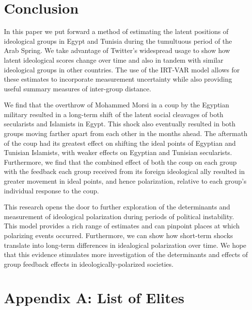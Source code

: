 \documentclass[12pt]{article}
\begin{document}
\section*{Conclusion}

In this paper we put forward a method of estimating the latent positions of ideological groups in Egypt and Tunisia during the tumultuous period of the Arab Spring. We take advantage of Twitter's widespread usage to show how latent ideological scores change over time and also in tandem with similar ideological groups in other countries. The use of the IRT-VAR model allows for these estimates to incorporate measurement uncertainty while also providing useful summary measures of inter-group distance.

We find that the overthrow of Mohammed Morsi in a coup by the Egyptian military resulted in a long-term shift of the latent social cleavages of both secularists and Islamists in Egypt. This shock also eventually resulted in both groups moving farther apart from each other in the months ahead. The aftermath of the coup had its greatest effect on shifting the ideal points of Egyptian and Tunisian Islamists, with weaker effects on Egyptian and Tunisian secularists. Furthermore, we find that the combined effect of both the coup on each group with the feedback each group received from its foreign ideological ally resulted in greater movement in ideal points, and hence polarization, relative to each group's individual response to the coup. 

This research opens the door to further exploration of the determinants and measurement of ideological polarization during periods of political instability. This model provides a rich range of estimates and can pinpoint places at which polarizing events occurred. Furthermore, we can show how short-term shocks translate into long-term differences in idealogical polarization over time. We hope that this evidence stimulates more investigation of the determinants and effects of group feedback effects in ideologically-polarized societies.

\section*{Appendix A: List of Elites}
\end{document}
